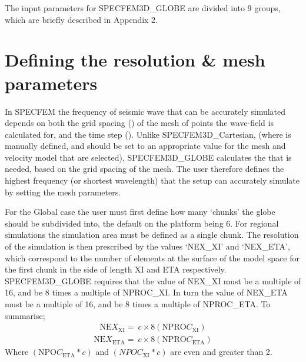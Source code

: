 \documentclass[english]{book}
\begin{document}
The input parameters for SPECFEM3D\_GLOBE are divided into 9 groups,
which are briefly described in Appendix 2.


\section{Defining the resolution \& mesh parameters}
\label{\detokenize{Section6:defining-the-resolution-mesh-parameters}}
In SPECFEM the frequency of seismic wave that can be accurately
simulated depends on both the grid spacing () of the mesh of points
the wave-field is calculated for, and the time step (). Unlike
SPECFEM3D\_Cartesian, (where  is manually defined, and should be set
to an appropriate value for the mesh and velocity model that are
selected), SPECFEM3D\_GLOBE calculates the  that is needed, based on
the grid spacing of the mesh. The user therefore defines the highest
frequency (or shortest wavelength) that the setup can accurately
simulate by setting the mesh parameters.

For the Global case the user must first define how many ‘chunks’ the
globe should be subdivided into, the default on the platform being 6.
For regional simulations the simulation area must be defined as a single
chunk. The resolution of the simulation is then prescribed by the values
‘NEX\_XI’ and ‘NEX\_ETA’, which correspond to the number of elements at
the surface of the model space for the first chunk in the side of length
XI and ETA respectively. SPECFEM3D\_GLOBE requires that the value of
NEX\_XI must be a multiple of 16, and be 8 times a multiple of
NPROC\_XI. In turn the value of NEX\_ETA must be a multiple of 16, and
be 8 times a multiple of NPROC\_ETA. To summarise;
\begin{equation*}
\begin{split}\text{NE}X_{\text{XI}} = \ c \times 8\left( \text{NPRO}C_{\text{XI}} \right)\end{split}
\end{equation*}\begin{equation*}
\begin{split}\text{NE}X_{\text{ETA}} = \ c \times 8\left( \text{NPRO}C_{\text{ETA}} \right)\end{split}
\end{equation*}
Where \((\text{NPO}C_{\text{ETA}}*c)\) and
\((NPOC_{\text{XI}}*c)\) are even and greater than 2.
\end{document}

